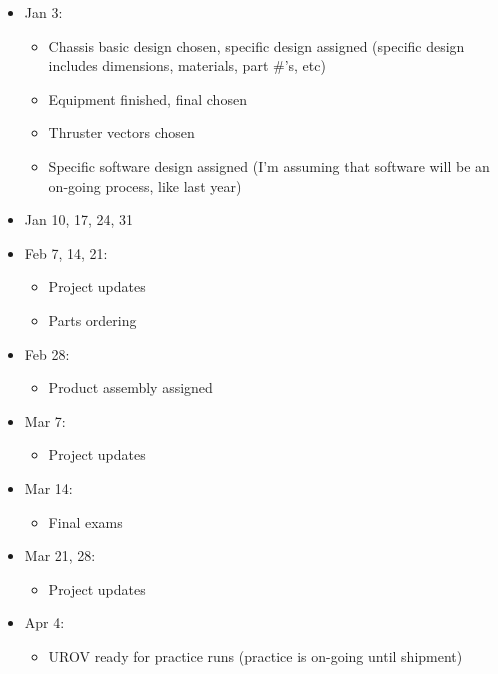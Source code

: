 \documentclass{proposalnsf}
\begin{document}
\begin{itemize}
\begin{itemize}
    \end{itemize}
\item Jan 3:
    \begin{itemize} 
         \item Chassis basic design chosen, specific design assigned (specific
design includes dimensions, materials, part \#'s, etc)
         \item Equipment finished, final chosen
         \item Thruster vectors chosen
         \item Specific software design assigned (I'm assuming that software
will be an on-going process, like last year)
    \end{itemize}

\item Jan 10, 17, 24, 31
\item Feb 7, 14, 21:
    \begin{itemize} 
         \item Project updates
         \item Parts ordering
    \end{itemize}

\item Feb 28:
    \begin{itemize} 
         \item Product assembly assigned
    \end{itemize}

\item Mar 7:
    \begin{itemize} 
         \item Project updates
    \end{itemize}

\item Mar 14:
    \begin{itemize} 
     \item Final exams

    \end{itemize}
\item Mar 21, 28:
    \begin{itemize} 
         \item Project updates

    \end{itemize}
\item Apr 4:
    \begin{itemize} 
     \item UROV ready for practice runs (practice is on-going until
shipment)
    \end{itemize}


\end{itemize}
\end{document}
